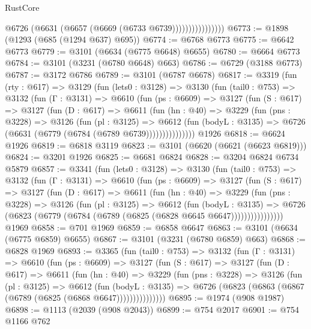 \begin{lexlean}{RustCore}
\begin{coremodule}
                          @6726 (@6631 (@6657 (@6669 (@6733 @6739))))))))))))))))
@6773 := @1898 (@1293 (@685 (@1294 @637) @695))
@6774 := @6768 @6773
@6775 := @6642 @6773
@6779 := @3101 (@6634 (@6775 @6648) @6655)
@6780 := @6664 @6773
@6784 := @3101 (@3231 (@6780 @6648) @663)
@6786 := @6729 (@3188 @6773)
@6787 := @3172 @6786
@6789 := @3101 (@6787 @6678)
@6817 := @3319
    (fun (rty : @617) =>
    @3129
      (fun (lets0 : @3128) =>
      @3130
        (fun (tail0 : @753) =>
        @3132
          (fun (Γ : @3131) =>
          @6610
            (fun (ps : @6609) =>
            @3127
              (fun (S : @617) =>
              @3127
                (fun (D : @617) =>
                @6611
                  (fun (hn : @40) =>
                  @3229
                    (fun (pns : @3228) =>
                    @3126
                      (fun (pl : @3125) =>
                      @6612
                        (fun (bodyL : @3135) =>
                        @6726 (@6631 (@6779 (@6784 (@6789 @6739)))))))))))))))
    @1926
@6818 := @6624 @1926
@6819 := @6818 @3119
@6823 := @3101 (@6620 (@6621 (@6623 @6819)))
@6824 := @3201 @1926
@6825 := @6681 @6824
@6828 := @3204 @6824 @6734 @5879
@6857 := @3341
    (fun (lets0 : @3128) =>
    @3130
      (fun (tail0 : @753) =>
      @3132
        (fun (Γ : @3131) =>
        @6610
          (fun (ps : @6609) =>
          @3127
            (fun (S : @617) =>
            @3127
              (fun (D : @617) =>
              @6611
                (fun (hn : @40) =>
                @3229
                  (fun (pns : @3228) =>
                  @3126
                    (fun (pl : @3125) =>
                    @6612
                      (fun (bodyL : @3135) =>
                      @6726 (@6823 (@6779 (@6784 (@6789 (@6825 (@6828 @6645 @6647))))))))))))))))
    @1969
@6858 := @701 @1969
@6859 := @6858 @6647
@6863 := @3101 (@6634 (@6775 @6859) @6655)
@6867 := @3101 (@3231 (@6780 @6859) @663)
@6868 := @6828 @1969
@6893 := @3365
    (fun (tail0 : @753) =>
    @3132
      (fun (Γ : @3131) =>
      @6610
        (fun (ps : @6609) =>
        @3127
          (fun (S : @617) =>
          @3127
            (fun (D : @617) =>
            @6611
              (fun (hn : @40) =>
              @3229
                (fun (pns : @3228) =>
                @3126
                  (fun (pl : @3125) =>
                  @6612
                    (fun (bodyL : @3135) =>
                    @6726 (@6823 (@6863 (@6867 (@6789 (@6825 (@6868 @6647)))))))))))))))
@6895 := @1974 (@908 @1987)
@6898 := @1113 (@2039 (@908 @2043))
@6899 := @754 @2017
@6901 := @754 @1166 @762

\end{coremodule}
\end{lexlean}
